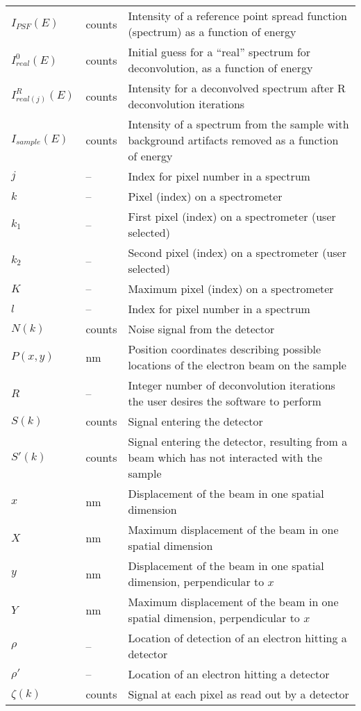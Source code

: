 \begin{longtable*}{l l p{11cm}}
    $I_{PSF}(E)$ & counts & Intensity of a reference point spread function
    (spectrum) as a function of energy\\
    $I_{real}^0(E)$ & counts & Initial guess for a ``real'' spectrum for
    deconvolution, as a function of energy\\
    $I_{real (j)}^R(E)$ & counts & Intensity for a deconvolved spectrum after R
    deconvolution iterations\\
    $I_{sample}(E)$ & counts & Intensity of a spectrum from the sample with
    background artifacts removed as a function of energy\\
    $j$ & -- & Index for pixel number in a spectrum\\
    $k$ & -- & Pixel (index) on a spectrometer\\
    $k_1$ & -- & First pixel (index) on a spectrometer (user selected)\\
    $k_2$ & -- & Second pixel (index) on a spectrometer (user selected)\\
    $K$ & -- & Maximum pixel (index) on a spectrometer\\
    $l$ & -- & Index for pixel number in a spectrum\\
    $N(k)$ & counts & Noise signal from the detector\\
    $P(x,y)$ & \si{\nano\metre} & Position coordinates describing possible locations
    of the electron beam on the sample\\
    $R$ & -- & Integer number of deconvolution iterations the user desires the
    software to perform\\
    $S(k)$ & counts & Signal entering the detector\\
    $S'(k)$ & counts & Signal entering the detector, resulting from a beam which has
    not interacted with the sample\\
    $x$ & \si{\nano\metre} & Displacement of the beam in one spatial dimension\\
    $X$ & \si{\nano\metre} & Maximum displacement of the beam in one spatial
    dimension\\
    $y$ & \si{\nano\metre} & Displacement of the beam in one spatial dimension,
    perpendicular to $x$\\
    $Y$ & \si{\nano\metre} & Maximum displacement of the beam in one spatial
    dimension, perpendicular to $x$\\
    $\rho$ & -- & Location of detection of an electron hitting a detector\\
    $\rho'$ & -- & Location of an electron hitting a detector\\
    $\zeta(k)$ & counts & Signal at each pixel as read out by a detector\\
    \bottomrule
\end{longtable*}